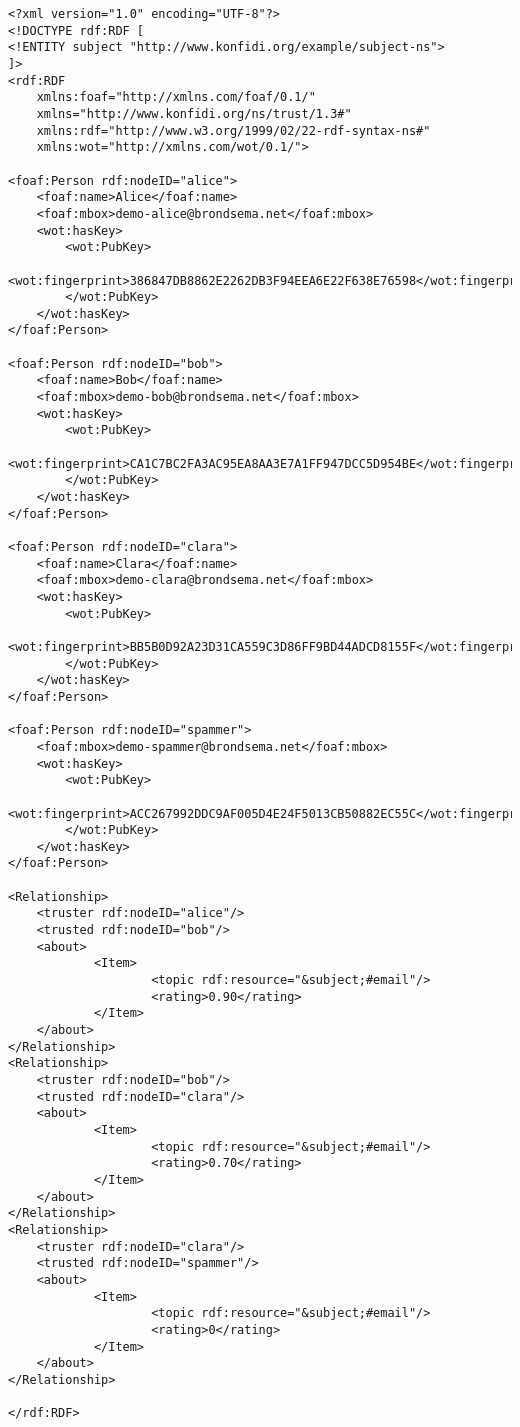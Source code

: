 \begin{verbatim}
<?xml version="1.0" encoding="UTF-8"?>
<!DOCTYPE rdf:RDF [
<!ENTITY subject "http://www.konfidi.org/example/subject-ns">
]>
<rdf:RDF
    xmlns:foaf="http://xmlns.com/foaf/0.1/"
    xmlns="http://www.konfidi.org/ns/trust/1.3#"
    xmlns:rdf="http://www.w3.org/1999/02/22-rdf-syntax-ns#"
    xmlns:wot="http://xmlns.com/wot/0.1/">

<foaf:Person rdf:nodeID="alice"> 
    <foaf:name>Alice</foaf:name>
    <foaf:mbox>demo-alice@brondsema.net</foaf:mbox>
    <wot:hasKey>
        <wot:PubKey>
            <wot:fingerprint>386847DB8862E2262DB3F94EEA6E22F638E76598</wot:fingerprint>
        </wot:PubKey>
    </wot:hasKey>
</foaf:Person>

<foaf:Person rdf:nodeID="bob"> 
    <foaf:name>Bob</foaf:name>
    <foaf:mbox>demo-bob@brondsema.net</foaf:mbox>
    <wot:hasKey>
        <wot:PubKey>
            <wot:fingerprint>CA1C7BC2FA3AC95EA8AA3E7A1FF947DCC5D954BE</wot:fingerprint>
        </wot:PubKey>
    </wot:hasKey>
</foaf:Person>

<foaf:Person rdf:nodeID="clara"> 
    <foaf:name>Clara</foaf:name>
    <foaf:mbox>demo-clara@brondsema.net</foaf:mbox>
    <wot:hasKey>
        <wot:PubKey>
            <wot:fingerprint>BB5B0D92A23D31CA559C3D86FF9BD44ADCD8155F</wot:fingerprint>
        </wot:PubKey>
    </wot:hasKey>
</foaf:Person>

<foaf:Person rdf:nodeID="spammer">
    <foaf:mbox>demo-spammer@brondsema.net</foaf:mbox>
    <wot:hasKey>
        <wot:PubKey>
            <wot:fingerprint>ACC267992DDC9AF005D4E24F5013CB50882EC55C</wot:fingerprint>
        </wot:PubKey>
    </wot:hasKey>
</foaf:Person>

<Relationship>
    <truster rdf:nodeID="alice"/>
    <trusted rdf:nodeID="bob"/>
    <about>
            <Item>
                    <topic rdf:resource="&subject;#email"/>
                    <rating>0.90</rating>
            </Item>
    </about>
</Relationship>
<Relationship>
    <truster rdf:nodeID="bob"/>
    <trusted rdf:nodeID="clara"/>
    <about>
            <Item>
                    <topic rdf:resource="&subject;#email"/>
                    <rating>0.70</rating>
            </Item>
    </about>
</Relationship>
<Relationship>
    <truster rdf:nodeID="clara"/>
    <trusted rdf:nodeID="spammer"/>
    <about>
            <Item>
                    <topic rdf:resource="&subject;#email"/>
                    <rating>0</rating>
            </Item>
    </about>
</Relationship>

</rdf:RDF>
\end{verbatim}
